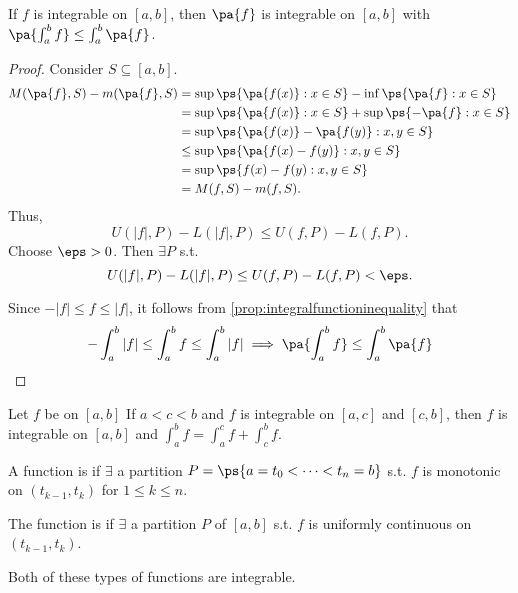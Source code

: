 \documentclass[11pt]{scrartcl}
\numberwithin{equation}{section}
\begin{document}
\begin{proposition}
    If $f$ is integrable on $[a,b]$, then $\pa{f}$ is integrable on $[a,b]$
    with $\pa{\int_a^b f}\leq \int_a^b\pa{f}$.
\end{proposition}

\begin{proof}
    Consider $S \subseteq [a,b]$. 
    \begin{align*}
        M(\pa{f},S)-m(\pa{f},S) &= \sup\ps{\pa{f(x)} : x\in S} - \inf\ps{\pa{f} : x\in S} \\
        &= \sup\ps{\pa{f(x)} : x\in S} + \sup\ps{-\pa{f} : x\in S} \\ 
        &= \sup\ps{\pa{f(x)} - \pa{f(y)} : x,y\in S} \\
        &\leq \sup\ps{\pa{f(x) - f(y)} : x,y\in S} \\
        &= \sup\ps{f(x) - f(y):x,y\in S} \\
        &= M(f,S) - m(f,S).
    \end{align*}
    Thus, 
    \[
        U(|f|,P) - L(|f|,P) \leq U(f,P) - L(f,P).
    \]
    Choose $\eps>0$. Then $\exists P$ s.t. 
    \[
        U(|f|,P) - L(|f|,P) \leq U(f,P) - L(f,P) < \eps.
    \]

    Since $-|f| \leq f \leq |f|$, it follows from \cref{prop:integralfunctioninequality} that 
    \[
        -\int_a^b|f| \leq \int_a^bf \leq \int_a^b|f| \implies 
        \pa{\int_a^b f}\leq \int_a^b\pa{f}\qedhere
    \]
\end{proof}

\begin{proposition}
    Let $f$ be on $[a,b]$ If $a<c<b$ and $f$ is integrable on $[a,c]$ 
    and $[c,b]$, then $f$ is integrable on $[a,b]$ and 
    $\int_a^bf = \int_a^cf+\int_c^bf$.
\end{proposition}

\begin{definition}
    A function is  if $\exists$ a partition 
    $P = \ps{a=t_0<\cdots<t_n=b}$ s.t. $f$ is monotonic on $(t_{k-1}, t_k)$ 
    for $1\leq k\leq n$. 
    
    The function is 
    if $\exists$ a partition $P$ of $[a,b]$ s.t. $f$ is 
    uniformly continuous on $(t_{k-1},t_k)$.
\end{definition}

Both of these types of functions are integrable.

\clearpage
\end{document}
